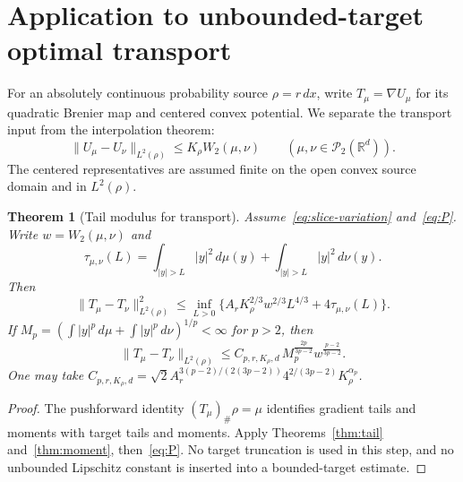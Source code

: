 \documentclass[11pt]{article}
\newtheorem{theorem}{Theorem}[section]
\theoremstyle{remark}\newtheorem{remark}[theorem]{Remark}
\newcommand{\R}{\mathbb R}\newcommand{\Var}{\operatorname{Var}}
\newcommand{\Ptwo}{\mathcal P_2}\newcommand{\TV}{\operatorname{TV}}
\newcommand{\norm}[1]{\lVert#1\rVert}\newcommand{\ind}{\mathbf 1}
\begin{document}
\section{Application to unbounded-target optimal transport}\label{sec:transport}
For an absolutely continuous probability source $\rho=r\,dx$, write $T_\mu=\nabla U_\mu$ for its quadratic Brenier map and centered convex potential. We separate the transport input from the interpolation theorem:
\begin{equation}\tag{P}\label{eq:P}
 \norm{U_\mu-U_\nu}_{L^2(\rho)}
 \le K_\rho W_2(\mu,\nu)\qquad(\mu,\nu\in\Ptwo(\R^d)).
\end{equation}
The centered representatives are assumed finite on the open convex source domain and in $L^2(\rho)$.

\begin{theorem}[Tail modulus for transport]\label{thm:transport}
Assume~\eqref{eq:slice-variation} and~\eqref{eq:P}. Write $w=W_2(\mu,\nu)$ and
\[
 \tau_{\mu,\nu}(L)=\int_{|y|>L}|y|^2\,d\mu(y)
                    +\int_{|y|>L}|y|^2\,d\nu(y).
\]
Then
\begin{equation}\label{eq:transport-tail}
 \boxed{\norm{T_\mu-T_\nu}_{L^2(\rho)}^2
 \le\inf_{L>0}\{A_rK_\rho^{2/3}w^{2/3}L^{4/3}
                         +4\tau_{\mu,\nu}(L)\}.}
\end{equation}
If $M_p=(\int|y|^p\,d\mu+\int|y|^p\,d\nu)^{1/p}<\infty$ for $p>2$, then
\begin{equation}\label{eq:transport-moment}
 \boxed{\norm{T_\mu-T_\nu}_{L^2(\rho)}
 \le C_{p,r,K_\rho,d}\,M_p^{\frac{2p}{3p-2}}
                         w^{\frac{p-2}{3p-2}}.}
\end{equation}
One may take
$C_{p,r,K_\rho,d}=\sqrt2 A_r^{3(p-2)/(2(3p-2))}4^{2/(3p-2)}K_\rho^{\alpha_p}$.
\end{theorem}
\begin{proof}
The pushforward identity $(T_\mu)_\#\rho=\mu$ identifies gradient tails and moments with target tails and moments. Apply Theorems~\ref{thm:tail} and~\ref{thm:moment}, then~\eqref{eq:P}. No target truncation is used in this step, and no unbounded Lipschitz constant is inserted into a bounded-target estimate.
\end{proof}
\end{document}
